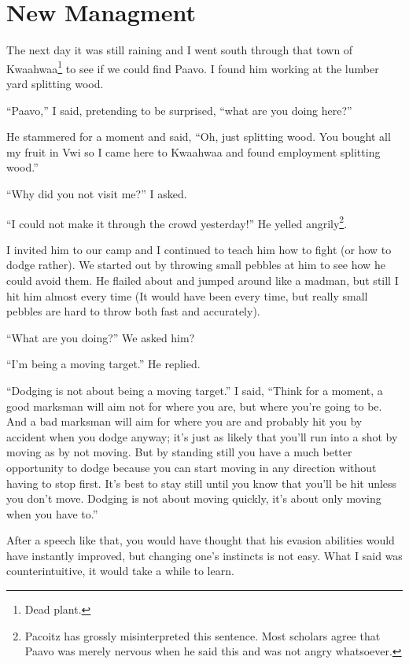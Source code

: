 \chapter{New Managment}

The next day it was still raining and I went south through that town of Kwaa\-hwaa\footnote{Dead plant.} to see if we could find Paa\-vo. I found him working at the lumber yard splitting wood.

``Paa\-vo,'' I said, pretending to be surprised, ``what are you doing here?''

He stammered for a moment and said, ``Oh, just splitting wood. You bought all my fruit in Vwi so I came here to Kwaa\-hwaa and found employment splitting wood.''

``Why did you not visit me?'' I asked.

``I could not make it through the crowd yesterday!'' He yelled angrily\footnote{Pa\-co\-itz has grossly misinterpreted this sentence. Most scholars agree that Paa\-vo was merely nervous when he said this and was not angry whatsoever.}.

I invited him to our camp and I continued to teach him how to fight (or how to dodge rather).
We started out by throwing small pebbles at him to see how he could avoid them. He flailed about and jumped around like a madman, but still I hit him almost every time (It would have been every time, but really small pebbles are hard to throw both fast and accurately).

``What are you doing?'' We asked him?

``I'm being a moving target.'' He replied.

``Dodging is not about being a moving target.'' I said, ``Think for a moment, a good marksman will aim not for where you are, but where you're going to be. And a bad marksman will aim for where you are and probably hit you by accident when you dodge anyway; it's just as likely that you'll run into a shot by moving as by not moving. But by standing still you have a much better opportunity to dodge because you can start moving in any direction without having to stop first. It's best to stay still until you know that you'll be hit unless you don't move.
Dodging is not about moving quickly, it's about only moving when you have to.''

After a speech like that, you would have thought that his evasion abilities would have instantly improved, but changing one's instincts is not easy. What I said was counterintuitive, it would take a while to learn.

